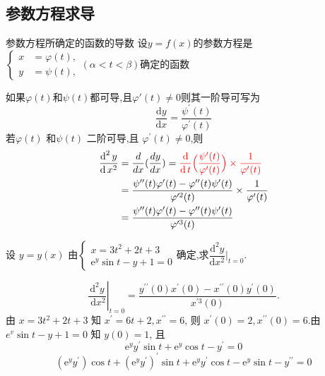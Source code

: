 \documentclass[8pt a4paper, oneside, UTF8]{ctexbook}  %
\begin{document}
\begin{sloppypar}
    \subsection{参数方程求导}
    \begin{defn}{参数方程所确定的函数的导数}{}
        设$y=f(x)$的参数方程是$\left\{\begin{aligned}x&=\varphi(t),\\y&=\psi (t),\end{aligned}\right.(\alpha<t<\beta)$确定的函数

        如果$\varphi(t)$和$\psi(t)$都可导,且$\varphi'(t) \neq 0$则其一阶导可写为
        $$
            \dfrac{\mathrm{d}y}{\mathrm{d}x}=\frac{\psi^{\prime}(t)}{\varphi^{\prime}(t)}
        $$
        若$\varphi(t)$ 和$\psi(t)$ 二阶可导,且 $\varphi^{\prime}(t)\neq 0$,则
        $$
            \begin{aligned}
                \frac{\operatorname{d}^2y}{\operatorname{d}x^2} & =\frac{d}{dx}(\frac{dy}{dx}) =\textcolor{red}{\frac{\operatorname{d}}{\operatorname{d}t}\Big(\frac{\psi'(t)}{\varphi'(t)}\Big) \times \frac{1}{\varphi'(t)}} \\
                                                                & =\frac{\psi''(t)\varphi'(t)-\varphi''(t)\psi'(t)}{\varphi'^2(t)}\times \frac{1}{\varphi'(t)}                                                                 \\
                                                                & =\frac{\psi''(t)\varphi'(t)-\varphi''(t)\psi'(t)}{\varphi'^3(t)}
            \end{aligned}
        $$
    \end{defn}
    \begin{problem}
    设 $y=y(x)$ 由$\begin{cases}x=3t^2+2t+3\\\mathrm{e}^y\sin t-y+1=0\end{cases}$确定,求$\dfrac{\mathrm{d}^2y}{\mathrm{d}x^2}\Bigg\vert_{t=0}.$
    \end{problem}
    \begin{solution}
        $$\left.\frac{\mathrm{d}^2 y}{\mathrm{~d} x^2}\right|_{t=0}=\frac{y^{\prime \prime}(0) x^{\prime}(0)-x^{\prime \prime}(0) y^{\prime}(0)}{x^{\prime 3}(0)}.$$
        由 $x=3 t^2+2 t+3$ 知 $x^{\prime}=6 t+2, x^{\prime \prime}=6$, 则 $x^{\prime}(0)=2, x^{\prime \prime}(0)=6$.由 $e^v \sin t-y+1=0$ 知 $y(0)=1$, 且
        $$
            \mathrm{e}^y y^{\prime} \sin t+\mathrm{e}^y \cos t-y^{\prime}=0
        $$
        $$
            \left(\mathrm{e}^y y^{\prime}\right) \cos t+\left(\mathrm{e}^y y^{\prime}\right)^{\prime} \sin t+\mathrm{e}^y y^{\prime} \cos t-\mathrm{e}^y \sin t-y^{\prime \prime}=0
$$
\end{solution}
\end{sloppypar}
\end{document}
